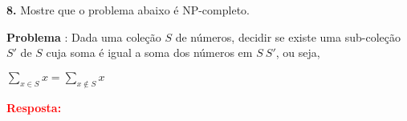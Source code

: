 
\noindent\textbf{8.} Mostre que o problema abaixo é NP-completo.

\indent\textbf{Problema} : Dada uma coleção $S$ de números, decidir se existe uma sub-coleção $S'$ de $S$ cuja soma é igual a soma dos números em $S \ S'$, ou seja,
\begin{center}
$\sum_{x \in S}{x} = \sum_{x \notin S}{x}$
\end{center}
\textcolor{red}{\textbf{Resposta:}}